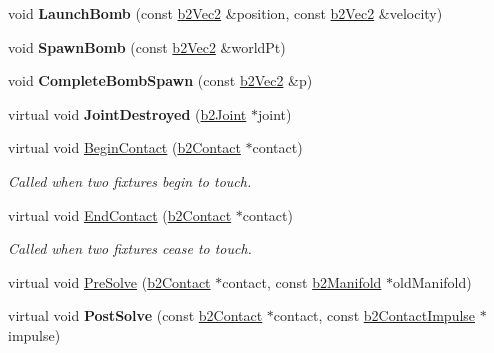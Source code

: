 \begin{DoxyCompactItemize}
\item 
\hypertarget{class_test_a433791c82ebf92a7e9c1b35463158008}{void {\bfseries Launch\-Bomb} (const \hyperlink{structb2_vec2}{b2\-Vec2} \&position, const \hyperlink{structb2_vec2}{b2\-Vec2} \&velocity)}\label{class_test_a433791c82ebf92a7e9c1b35463158008}

\item 
\hypertarget{class_test_a3c7ac01710bbc0371aa0513b970cb4a4}{void {\bfseries Spawn\-Bomb} (const \hyperlink{structb2_vec2}{b2\-Vec2} \&world\-Pt)}\label{class_test_a3c7ac01710bbc0371aa0513b970cb4a4}

\item 
\hypertarget{class_test_a5f79351b4f312e7ecbdbfd92e76fc806}{void {\bfseries Complete\-Bomb\-Spawn} (const \hyperlink{structb2_vec2}{b2\-Vec2} \&p)}\label{class_test_a5f79351b4f312e7ecbdbfd92e76fc806}

\item 
\hypertarget{class_test_a27badb0e44400afbbbb101e58ac7bf4f}{virtual void {\bfseries Joint\-Destroyed} (\hyperlink{classb2_joint}{b2\-Joint} $\ast$joint)}\label{class_test_a27badb0e44400afbbbb101e58ac7bf4f}

\item 
\hypertarget{class_test_ade381c3186c925cdf5dc30b0153411ba}{virtual void \hyperlink{class_test_ade381c3186c925cdf5dc30b0153411ba}{Begin\-Contact} (\hyperlink{classb2_contact}{b2\-Contact} $\ast$contact)}\label{class_test_ade381c3186c925cdf5dc30b0153411ba}

\begin{DoxyCompactList}\small\item\em Called when two fixtures begin to touch. \end{DoxyCompactList}\item 
\hypertarget{class_test_a07844a975adb8d27f9523db4addd9813}{virtual void \hyperlink{class_test_a07844a975adb8d27f9523db4addd9813}{End\-Contact} (\hyperlink{classb2_contact}{b2\-Contact} $\ast$contact)}\label{class_test_a07844a975adb8d27f9523db4addd9813}

\begin{DoxyCompactList}\small\item\em Called when two fixtures cease to touch. \end{DoxyCompactList}\item 
virtual void \hyperlink{class_test_a876f3c1971cc4a3178346c836ff84935}{Pre\-Solve} (\hyperlink{classb2_contact}{b2\-Contact} $\ast$contact, const \hyperlink{structb2_manifold}{b2\-Manifold} $\ast$old\-Manifold)
\item 
\hypertarget{class_test_a73c8522bad357c7762893109ca28e20a}{virtual void {\bfseries Post\-Solve} (const \hyperlink{classb2_contact}{b2\-Contact} $\ast$contact, const \hyperlink{structb2_contact_impulse}{b2\-Contact\-Impulse} $\ast$impulse)}\label{class_test_a73c8522bad357c7762893109ca28e20a}

\end{DoxyCompactItemize}
